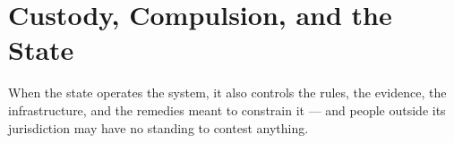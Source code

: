 \chapter{Custody, Compulsion, and the State}
\label{sec:15}
When the state operates the system, it also controls the rules, the evidence, the infrastructure, and the remedies meant to constrain it — and people outside its jurisdiction may have no standing to contest anything.
